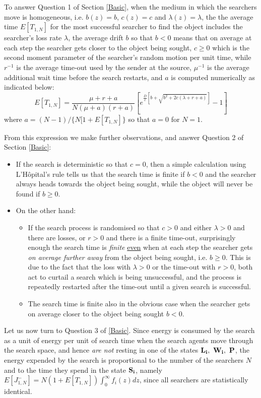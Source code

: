 \documentclass[journal]{IEEEtran}
\begin{document}
To answer Question 1 of Section \ref{Basic}, when the medium in which the searchers move is homogeneous, i.e. $b(z)=b$, $c(z)=c$ and $\lambda(z)=\lambda$,  the
the average time $E[T_{1,N}]$ for
the most successful searcher to find the object \cite{Gelenbe2010} includes
the searcher's loss rate $\lambda$, the average drift $b$ so that $b<0$ means that on average at each step the searcher gets closer to the object being sought,
$c\geq 0$ which is the second moment parameter of the searcher's random motion per unit time, while $r^{-1}$ is the average time-out used by the sender at the source, $\mu^{-1}$ is the average additional wait time before the search restarts, and $a$ is computed numerically as indicated below:
\begin{equation}\label{time}
E[T_{1,N}]  = \frac{\mu+r+a}{N(\mu+a)(r+a)} [e^{\frac{D}{c}[b+\sqrt{b^2+2c(\lambda+r+a)}]}-1]
\end{equation}
where $a=(N-1)/\{N[1+E[T_{1,N}]\}$ so that $a=0$ for $N=1$.

From this expression we make further observations,
and answer Question 2 of Section \ref{Basic}:
\begin{itemize}
\item If the search is deterministic so that $c=0$, then a simple calculation
using L'H\^{o}pital's rule tells us that the search time is finite if $b<0$ and the searcher always heads towards the object being sought,
while the object will never be found if $b\geq 0$.
\item On the other hand:
\begin{itemize}
\item If the search process is randomised so that $c>0$  and either $\lambda >0$ and there are losses, or $r >0$ and there is a finite time-out, surprisingly enough the search time is {\em finite}
\underline{even} when at each step the searcher gets {\em on average further away} from the object being sought, i.e. $b\geq 0$. This is due to the fact that the
loss with $\lambda>0$ or the time-out with $r >0$, both act to curtail a search which is being unsuccessful, and the process is repeatedly restarted after the time-out
until a given search is successful.
\item The search time is finite also in the obvious case when the searcher gets on average closer to the object being sought $b<0$.
\end{itemize}
\end{itemize}



Let us now turn to Question 3 of \ref{Basic}. Since energy is consumed by the search as a unit of energy per unit of search time when the
search agents move through the search space, and hence {\em are not} resting in one of the states ${\bf L_i,~W_i,~P}$, the energy expended by the search is proportional to
the number of the searchers $N$ and to the time they spend in the state ${\bf S_i}$, namely
$E[J_{1,N}^-] = N(1+E[T_{1,N}])\int_0^\infty f_i(z)dz$, since all searchers are statistically identical.
\end{document}
